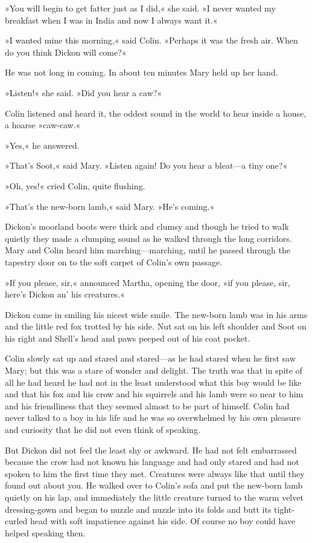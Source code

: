 »You will begin to get fatter just as I did,« she said. »I never wanted my breakfast when I was in India and now I always want it.«

»I wanted mine this morning,« said Colin. »Perhaps it was the fresh air. When do you think Dickon will come?«

He was not long in coming. In about ten minutes Mary held up her hand.

»Listen!« she said. »Did you hear a caw?«

Colin listened and heard it, the oddest sound in the world to hear inside a house, a hoarse »caw-caw.«

»Yes,« he answered.

»That's Soot,« said Mary. »Listen again! Do you hear a bleat—a tiny one?«

»Oh, yes!« cried Colin, quite flushing.

»That's the new-born lamb,« said Mary. »He's coming.«

Dickon's moorland boots were thick and clumsy and though he tried to walk quietly they made a clumping sound as he walked through the long corridors. Mary and Colin heard him marching—marching, until he passed through the tapestry door on to the soft carpet of Colin's own passage.

»If you please, sir,« announced Martha, opening the door, »if you please, sir, here's Dickon an' his creatures.«

Dickon came in smiling his nicest wide smile. The new-born lamb was in his arms and the little red fox trotted by his side. Nut sat on his left shoulder and Soot on his right and Shell's head and paws peeped out of his coat pocket.

Colin slowly sat up and stared and stared—as he had stared when he first saw Mary; but this was a stare of wonder and delight. The truth was that in spite of all he had heard he had not in the least understood what this boy would be like and that his fox and his crow and his squirrels and his lamb were so near to him and his friendliness that they seemed almost to be part of himself. Colin had never talked to a boy in his life and he was so overwhelmed by his own pleasure and curiosity that he did not even think of speaking.

But Dickon did not feel the least shy or awkward. He had not felt embarrassed because the crow had not known his language and had only stared and had not spoken to him the first time they met. Creatures were always like that until they found out about you. He walked over to Colin's sofa and put the new-born lamb quietly on his lap, and immediately the little creature turned to the warm velvet dressing-gown and began to nuzzle and nuzzle into its folds and butt its tight-curled head with soft impatience against his side. Of course no boy could have helped speaking then.

